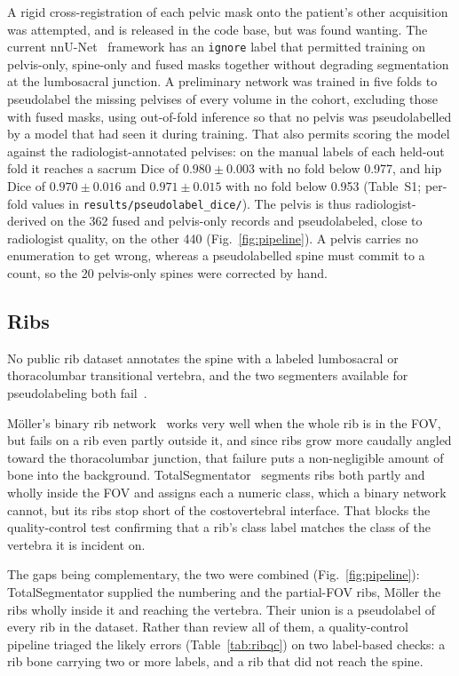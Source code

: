 \documentclass[aapm,mph,amsmath,amssymb,preprint,linenumbers]{revtex4-2}
\begin{document}
A rigid cross-registration of each pelvic mask onto the patient's other acquisition was
attempted, and is released in the code base, but was found wanting. The current
nnU-Net~\cite{nnunet} framework has an \texttt{ignore} label that permitted training on
pelvis-only, spine-only and fused masks together without degrading segmentation at the
lumbosacral junction. A preliminary network was trained in five folds to pseudolabel the
missing pelvises of every volume in the cohort, excluding those with fused masks, using
out-of-fold inference so that no pelvis was pseudolabelled by a model that had seen it during
training. That also permits scoring the model against the radiologist-annotated pelvises: on
the manual labels of each held-out fold it reaches a sacrum Dice of $0.980 \pm 0.003$ with no
fold below 0.977, and hip Dice of $0.970 \pm 0.016$ and $0.971 \pm 0.015$ with no fold below
0.953 (Table~S1; per-fold values in \texttt{results/pseudolabel\_dice/}). The pelvis is thus
radiologist-derived on the 362 fused and pelvis-only records and pseudolabeled, close to
radiologist quality, on the other 440 (Fig.~\ref{fig:pipeline}). A pelvis carries no enumeration to get wrong,
whereas a pseudolabelled spine must commit to a count, so the 20 pelvis-only spines were
corrected by hand.

\subsection{Ribs}

No public rib dataset annotates the spine with a labeled lumbosacral or thoracolumbar
transitional vertebra, and the two segmenters available for pseudolabeling both
fail~\cite{moller2026,totalsegmentator}.

Möller's binary rib network~\cite{moller2026} works very well when the whole rib is in the FOV,
but fails on a rib even partly outside it, and since ribs grow more caudally angled toward the
thoracolumbar junction, that failure puts a non-negligible amount of bone into the background.
TotalSegmentator~\cite{totalsegmentator} segments ribs both partly and wholly inside the FOV
and assigns each a numeric class, which a binary network cannot, but its ribs stop short of the
costovertebral interface. That blocks the quality-control test confirming that a rib's class
label matches the class of the vertebra it is incident on.

The gaps being complementary, the two were combined (Fig.~\ref{fig:pipeline}): TotalSegmentator
supplied the numbering and the partial-FOV ribs, Möller the ribs wholly inside it and reaching
the vertebra. Their union is a pseudolabel of every rib in the dataset. Rather than review all
of them, a quality-control pipeline triaged the likely errors (Table~\ref{tab:ribqc}) on two
label-based checks: a rib bone carrying two or more labels, and a rib that did not reach the
spine.
\end{document}
